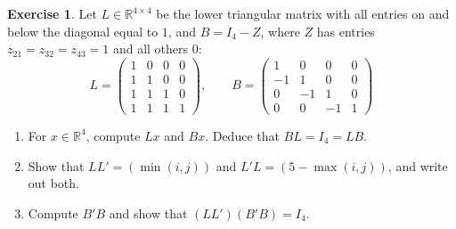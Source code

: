 \documentclass[12pt]{article}
\newcommand{\R}{\mathbb R}
\theoremstyle{definition}
\newtheorem{exercise}{Exercise}
\begin{document}
\begin{exercise}\label{r1-ex-triangular}
Let \(L\in\R^{4\times4}\) be the lower triangular matrix with all entries on and below the
diagonal equal to \(1\), and \(B=I_4-Z\), where \(Z\) has entries \(z_{21}=z_{32}=z_{43}=1\) and
all others \(0\):
\[
L=\begin{pmatrix}1&0&0&0\\1&1&0&0\\1&1&1&0\\1&1&1&1\end{pmatrix},\qquad
B=\begin{pmatrix}1&0&0&0\\-1&1&0&0\\0&-1&1&0\\0&0&-1&1\end{pmatrix}
\]
\begin{enumerate}
\item For \(x\in\R^4\), compute \(Lx\) and \(Bx\). Deduce that \(BL=I_4=LB\).
\item Show that \(LL'=(\min(i,j))\) and \(L'L=(5-\max(i,j))\), and write out both.
\item Compute \(B'B\) and show that \((LL')(B'B)=I_4\).
\end{enumerate}
\end{exercise}
\end{document}
